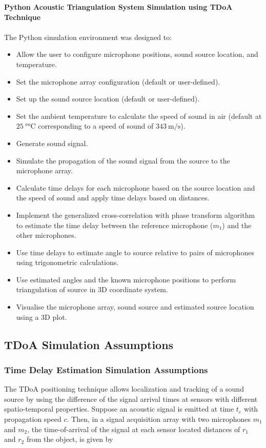 \documentclass[a4paper,11pt]{article}
\begin{document}
\noindent
\textbf{Python Acoustic Triangulation System Simulation using TDoA Technique}\\\\
The Python simulation environment was designed to:
\begin{itemize}
	\item 
	Allow the user to configure microphone positions, sound source location, and temperature.
	\item 
	Set the microphone array configuration (default or user-defined). 
	\item
	Set up the sound source location (default or user-defined).
	\item 
	Set the ambient temperature to calculate the speed of sound in air (default at $\SI{25}{\degree\celsius}$ corresponding to a speed of sound of $\SI{343}{\meter\per\second}$). 
	\item 
	Generate sound signal. 
	\item
	Simulate the propagation of the sound signal from the source to the microphone array. 
	\item 
	Calculate time delays for each microphone based on the source location and the speed of sound and apply time delays based on distances.
	\item 
	Implement the generalized cross-correlation with phase transform algorithm to estimate the time delay between the reference microphone ($m_1$) and the other microphones.
	\item 
	Use time delays to estimate angle to source relative to pairs of microphones using trigonometric calculations.
	\item 
	Use estimated angles and the known microphone positions to perform triangulation of source in 3D coordinate system.
	\item
	Visualise the microphone array, sound source and estimated source location using a 3D plot.
\end{itemize}

\subsection{TDoA Simulation Assumptions}

\subsubsection{Time Delay Estimation Simulation Assumptions}

The TDoA positioning technique allows localization and tracking of a sound source by using the difference of the signal arrival times at sensors with different spatio-temporal properties. Suppose an acoustic signal is emitted at time $t_e$ with propagation speed $c$. Then, in a signal acquisition array with two microphones $m_1$ and $m_2$, the time-of-arrival of the signal at each sensor located distances of $r_1$ and $r_2$ from the object, is given by 
\end{document}
